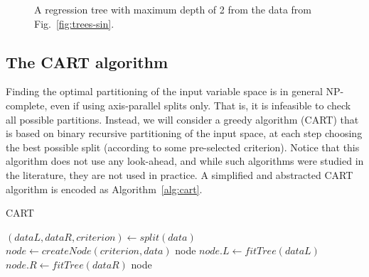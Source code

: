 \begin{figure}[htbp]
\label{fig:fig:trees-sin-2}
\caption{A regression tree with maximum depth of 2 from the data from Fig.~\ref{fig:trees-sin}.}
\end{figure}



\subsection*{The CART algorithm}

Finding the optimal partitioning of the input variable space is in general NP-complete, even if using axis-parallel splits only. That is, it is infeasible to check all possible partitions. Instead, we will consider a greedy algorithm (CART) that is based on binary recursive partitioning of the input space, at each step choosing the best possible split (according to some pre-selected criterion). Notice that this algorithm does not use any look-ahead, and while such algorithms were studied in the literature, they are not used in practice. A simplified and abstracted CART algorithm is encoded as Algorithm~\ref{alg:cart}.


\begin{algorithm}
\caption{CART}\label{alg:cart}
\begin{algorithmic}[1]
\State $(dataL, dataR, criterion) \gets split(data)$
\State $node \gets createNode(criterion, data)$
 \Return node \EndIf
\State $node.L \gets fitTree(dataL)$
\State $node.R \gets fitTree(dataR)$
\State \Return node
\EndProcedure
\end{algorithmic}
\end{algorithm}

